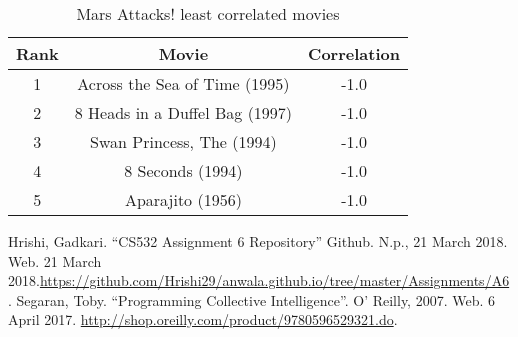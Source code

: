 \documentclass[letterpaper,11pt]{article}
\begin{document}
\begin{table}[htb]
\centering
\begin{tabular}{ | c | c | c |}
\hline
\textbf{Rank} & \textbf{Movie} & \textbf{Correlation} \\
\hline
1 & Across the Sea of Time (1995) & -1.0 \\
\hline
2 & 8 Heads in a Duffel Bag (1997) & -1.0 \\
\hline
3 & Swan Princess, The (1994) & -1.0 \\ 
\hline
4 & 8 Seconds (1994) & -1.0 \\
\hline
5 & Aparajito (1956) & -1.0 \\
\hline
\end{tabular}
\caption{Mars Attacks! least correlated movies}
\label{table:q4least2}
\end{table}

\clearpage


\begin{thebibliography}{9}
Hrishi, Gadkari. ``CS532 Assignment 6 Repository'' Github. N.p., 21 March 2018. Web. 21 March 2018.\url{https://github.com/Hrishi29/anwala.github.io/tree/master/Assignments/A6}.
Segaran, Toby. ``Programming Collective Intelligence''. O' Reilly, 2007. Web. 6 April 2017. \url{http://shop.oreilly.com/product/9780596529321.do}.
\end{thebibliography}
\end{document}
